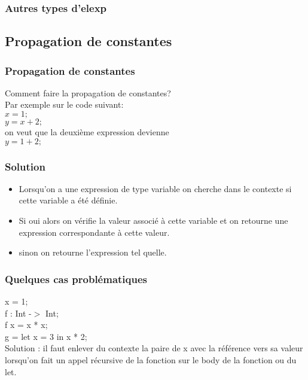 \documentclass{beamer}
\begin{document}

\begin{frame}
\frametitle{Autres types d'elexp}
\end{frame}

\subsection{Propagation de constantes} 

\begin{frame}
\frametitle{Propagation de constantes}
Comment faire la propagation de constantes?\\
Par exemple sur le code suivant:\\
$x = 1;$\\
\bigskip
$y = x + 2;$\\
\bigskip
on veut que la deuxième expression devienne \\
$y = 1 + 2;$\\

\end{frame}

\begin{frame}
\frametitle{Solution}
    \begin{itemize}
        \item Lorsqu'on a une expression de type variable on cherche dans le contexte si cette variable a été définie.
        \item Si oui alors on vérifie la valeur associé à cette variable et on retourne une expression correspondante à cette valeur.
        \item sinon on retourne l'expression tel quelle.
    \end{itemize}
\end{frame}

\begin{frame}
    \frametitle{Quelques cas problématiques}
    x = 1; \\
    \bigskip
    f : Int -$>$ Int;\\
    f x = x * x;\\
    \bigskip
    g = let x = 3 in x * 2;\\
    \bigskip
    Solution : il faut enlever du contexte la paire de x avec la référence vers sa valeur lorsqu'on fait un appel récursive
    de la fonction sur le body de la fonction ou du let.
\end{frame}
\end{document}

